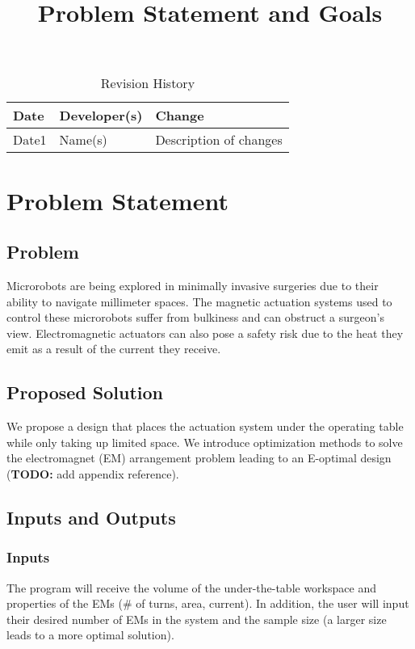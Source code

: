 \documentclass{article}
\title{Problem Statement and Goals\\\progname}
\author{\authname}
\date{}
\begin{document}
\maketitle

\begin{table}[hp]
\caption{Revision History} \label{TblRevisionHistory}
\begin{tabularx}{\textwidth}{llX}
\toprule
\textbf{Date} & \textbf{Developer(s)} & \textbf{Change}\\
\midrule
Date1 & Name(s) & Description of changes\\
\bottomrule
\end{tabularx}
\end{table}

\section{Problem Statement}

\subsection{Problem}
Microrobots are being explored in minimally invasive surgeries due to their ability to navigate millimeter spaces. The magnetic actuation systems used to control these microrobots suffer from bulkiness and can obstruct a surgeon's view. Electromagnetic actuators can also pose a safety risk due to the heat they emit as a result of the current they receive. 

\subsection{Proposed Solution}
We propose a design that places the actuation system under the operating table while only taking up limited space. We introduce optimization methods to solve the electromagnet (EM) arrangement problem leading to an E-optimal design (\textbf{TODO:} add appendix reference). 

\subsection{Inputs and Outputs}
\subsubsection{Inputs}
The program will receive the volume of the under-the-table workspace and properties of the EMs (\# of turns, area, current). In addition, the user will input their desired number of EMs in the system and the sample size (a larger size leads to a more optimal solution).
\end{document}
